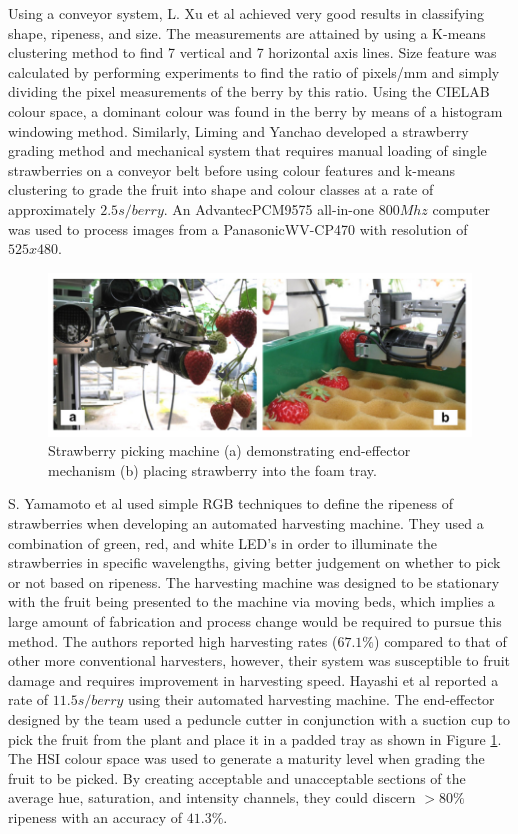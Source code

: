 \documentclass[fleqn,twoside,12pt]{report}
\begin{document}
Using a conveyor system, L. Xu et al \cite{xu} achieved very good results in classifying shape, ripeness, and size. The measurements are attained by using a K-means clustering method to find 7 vertical and 7 horizontal axis lines. Size feature was calculated by performing experiments to find the ratio of pixels/mm and simply dividing the pixel measurements of the berry by this ratio. Using the CIELAB colour space, a dominant colour was found in the berry by means of a histogram windowing method. Similarly, Liming and Yanchao \cite{liming} developed a strawberry grading method and mechanical system that requires manual loading of single strawberries on a conveyor belt before using colour features and k-means clustering to grade the fruit into shape and colour classes at a rate of approximately $2.5s/berry$. An Advantec\texttrademark PCM9575 all-in-one $800Mhz$ computer was used to process images from a Panasonic\texttrademark WV-CP470 with resolution of $525x480$. 


\begin{figure}[h]
	\centering
	\includegraphics[width=0.9\linewidth]{strawberry_picker.png}
	\caption{Strawberry picking machine (a) demonstrating end-effector mechanism (b) placing strawberry into the foam tray.}
	\label{fig:strawberry_picker}
\end{figure}%


S. Yamamoto et al \cite{yamamoto2} used simple RGB techniques to define the ripeness of strawberries when developing an automated harvesting machine. They used a combination of green, red, and white LED's in order to illuminate the strawberries in specific wavelengths, giving better judgement on whether to pick or not based on ripeness. The harvesting machine was designed to be stationary with the fruit being presented to the machine via moving beds, which implies a large amount of fabrication and process change would be required to pursue this method. The authors reported high harvesting rates ($67.1\%$) compared to that of other more conventional harvesters, however, their system was susceptible to fruit damage and requires improvement in harvesting speed. Hayashi et al \cite{hayashi} reported a rate of $11.5s/berry$ using their automated harvesting machine. The end-effector designed by the team used a peduncle cutter in conjunction with a suction cup to pick the fruit from the plant and place it in a padded tray as shown in Figure \ref{fig:strawberry_picker}. The HSI colour space was used to generate a maturity level when grading the fruit to be picked. By creating acceptable and unacceptable sections of the average hue, saturation, and intensity channels, they could discern $>80\%$ ripeness with an accuracy of $41.3\%$.
\end{document}
